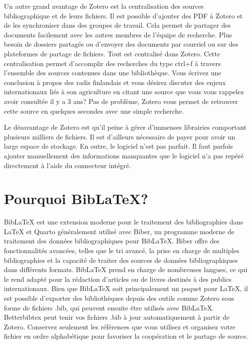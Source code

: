 \documentclass[
  letterpaper,
]{scrbook}
\begin{document}
Un autre grand avantage de Zotero est la centralisation des sources
bibliographique et de leurs fichiers. Il est possible d'ajouter des PDF
à Zotero et de les synchroniser dans des groupes de travail. Cela permet
de partager des documents facilement avec les autres membres de l'équipe
de recherche. Plus besoin de dossiers partagés ou d'envoyer des
documents par courriel ou sur des plateformes de partage de fichiers.
Tout est centralisé dans Zotero. Cette centralisation permet d'accomplir
des recherches du type ctrl+f à travers l'ensemble des sources contenues
dans une bibliothèque. Vous écrivez une conclusion à propos des radis
finlandais et vous désirez discuter des enjeux internationaux liés à son
agriculture en citant une source que vous vous rappelez avoir consultée
il y a 3 ans? Pas de problème, Zotero vous permet de retrouver cette
source en quelques secondes avec une simple recherche.

Le désavantage de Zotero est qu'il peine à gérer d'immenses librairies
comportant plusieurs milliers de fichiers. Il est d'ailleurs nécessaire
de payer pour avoir un large espace de stockage. En outre, le logiciel
n'est pas parfait. Il faut parfois ajouter manuellement des informations
manquantes que le logiciel n'a pas repéré directement à l'aide du
connecteur intégré.

\hypertarget{pourquoi-biblatex}{%
\section{Pourquoi BibLaTeX?}\label{pourquoi-biblatex}}

BibLaTeX est une extension moderne pour le traitement des bibliographies
dans LaTeX et Quarto généralement utilisé avec Biber, un programme
moderne de traitement des données bibliographiques pour BibLaTeX. Biber
offre des fonctionnalités avancées, telles que le tri avancé, la prise
en charge de multiples bibliographies et la capacité de traiter des
sources de données bibliographiques dans différents formats. BibLaTeX
prend en charge de nombreuses langues, ce qui le rend adapté pour la
rédaction d'articles ou de livres destinés à des publics internationaux.
Bien que BibLaTeX soit principalement un paquet pour LaTeX, il est
possible d'exporter des bibliothèques depuis des outils comme Zotero
sous forme de fichiers .bib, qui peuvent ensuite être utilisés avec
BibLaTeX. Betterbibtex peut tenir vos fichiers .bib à jour
automatiquement à partir de Zotero. Conservez seulement les références
que vous utilisez et organisez votre fichier en ordre alphabétique pour
favoriser la coopération et le partage de source.
\end{document}
